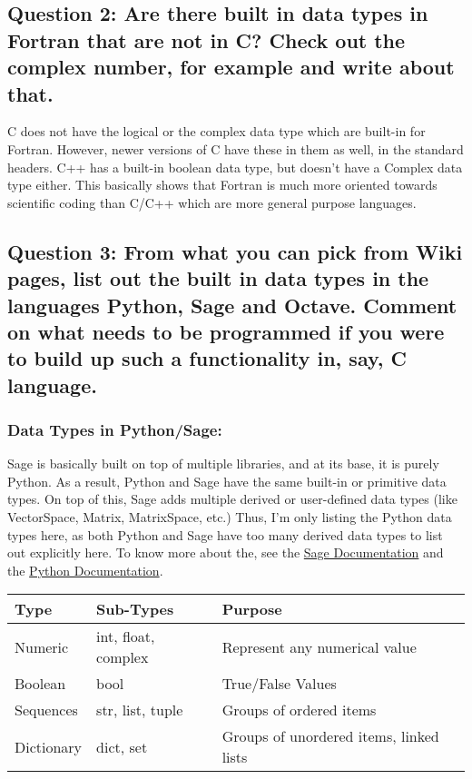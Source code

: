 \documentclass[12pt,a4paper]{article}
\begin{document}
\subsection{Question 2: Are there built in data types in Fortran that are not in C? Check out the complex number, for
example and write about that.}

C does not have the logical or the complex data type which are built-in for Fortran. However, newer versions of C have these in them as well, in the standard headers. C++ has a built-in boolean data type, but doesn't have a Complex data type either. This basically shows that Fortran is much more oriented towards scientific coding than C/C++ which are more general purpose languages.

\subsection{Question 3: From what you can pick from Wiki pages, list out the built in data types in the languages
Python, Sage and Octave. Comment on what needs to be programmed if you were to build up such
a functionality in, say, C language.}

\subsubsection{Data Types in Python/Sage:}

Sage is basically built on top of multiple libraries, and at its base, it is purely Python. As a result, Python and Sage have the same built-in or primitive data types. On top of this, Sage adds multiple derived or user-defined data types (like VectorSpace, Matrix, MatrixSpace, etc.) Thus, I'm only listing the Python data types here, as both Python and Sage have too many derived data types to list out explicitly here. To know more about the, see the \href{http://doc.sagemath.org/html/en/tutorial/programming.html#data-types}{Sage Documentation} and the \href{https://docs.python.org/3/library/datatypes.html}{Python Documentation}.

\begin{tabular}{|l|p{5cm}|p{6cm}|}
	\hline	
	Type & Sub-Types & Purpose\\
	\hline
	Numeric & int, float, complex & Represent any numerical value\\
	Boolean & bool & True/False Values\\
	Sequences & str, list, tuple & Groups of ordered items\\
	Dictionary & dict, set & Groups of unordered items, linked lists\\
	\hline
\end{tabular}
\end{document}
